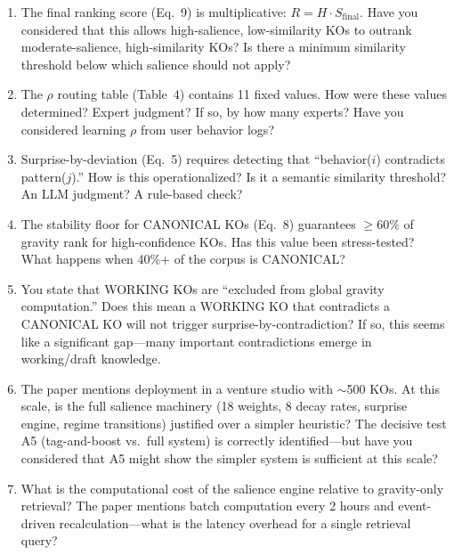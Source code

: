 \documentclass[11pt,a4paper]{article}
\begin{document}
\begin{enumerate}[label=\textbf{Q\arabic*.}, leftmargin=2cm]
\item The final ranking score (Eq.~9) is multiplicative: $R = H \cdot S_{\text{final}}$. Have you considered that this allows high-salience, low-similarity KOs to outrank moderate-salience, high-similarity KOs? Is there a minimum similarity threshold below which salience should not apply?

\item The $\rho$ routing table (Table~4) contains 11 fixed values. How were these values determined? Expert judgment? If so, by how many experts? Have you considered learning $\rho$ from user behavior logs?

\item Surprise-by-deviation (Eq.~5) requires detecting that ``behavior($i$) contradicts pattern($j$).'' How is this operationalized? Is it a semantic similarity threshold? An LLM judgment? A rule-based check?

\item The stability floor for CANONICAL KOs (Eq.~8) guarantees $\geq 60\%$ of gravity rank for high-confidence KOs. Has this value been stress-tested? What happens when 40\%+ of the corpus is CANONICAL?

\item You state that WORKING KOs are ``excluded from global gravity computation.'' Does this mean a WORKING KO that contradicts a CANONICAL KO will not trigger surprise-by-contradiction? If so, this seems like a significant gap---many important contradictions emerge in working/draft knowledge.

\item The paper mentions deployment in a venture studio with $\sim$500 KOs. At this scale, is the full salience machinery (18 weights, 8 decay rates, surprise engine, regime transitions) justified over a simpler heuristic? The decisive test A5 (tag-and-boost vs.\ full system) is correctly identified---but have you considered that A5 might show the simpler system is sufficient at this scale?

\item What is the computational cost of the salience engine relative to gravity-only retrieval? The paper mentions batch computation every 2 hours and event-driven recalculation---what is the latency overhead for a single retrieval query?
\end{enumerate}

\end{document}
